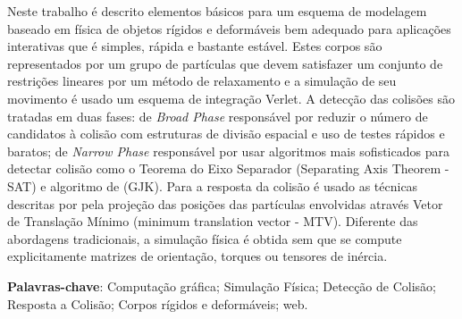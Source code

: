 \begin{resumo}
	\begin{SingleSpace}
		Neste trabalho é descrito elementos básicos para um esquema de modelagem baseado em física de objetos rígidos e deformáveis bem adequado para aplicações interativas que é simples, rápida e bastante estável. Estes corpos são representados por um grupo de partículas que devem satisfazer um conjunto de restrições lineares por um método de relaxamento e a simulação de seu movimento é usado um esquema de integração Verlet. A detecção das colisões são tratadas em duas fases: de \textit{Broad Phase} responsável por reduzir o número de candidatos à colisão com estruturas de divisão espacial e uso de testes rápidos e baratos; de \textit{Narrow Phase} responsável por usar algoritmos mais sofisticados para detectar colisão como o Teorema do Eixo Separador (Separating Axis Theorem - SAT) e algoritmo de  (GJK). Para a resposta da colisão é usado as técnicas descritas por  pela projeção das posições das partículas envolvidas através Vetor de Translação Mínimo (minimum translation vector - MTV). Diferente das abordagens tradicionais, a simulação física é obtida sem que se compute explicitamente matrizes de orientação, torques ou tensores de inércia.
	\end{SingleSpace}
	\vspace{\onelineskip}
	\textbf{Palavras-chave}: Computação gráfica; Simulação Física; Detecção de Colisão; Resposta a Colisão; Corpos rígidos e deformáveis; web.
\end{resumo}


